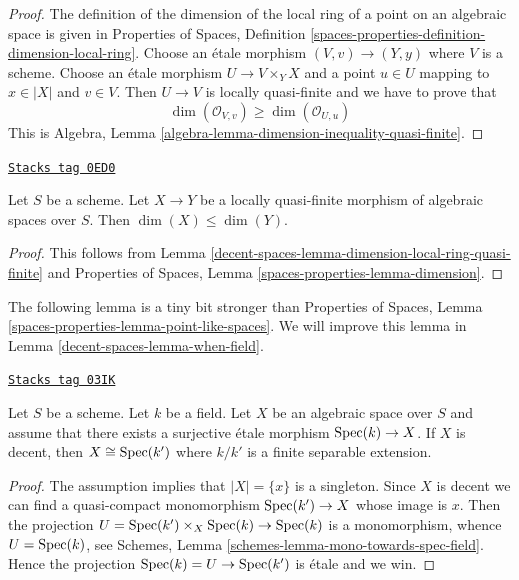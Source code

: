 \begin{proof}
The definition of the dimension of the local ring of a point on an
algebraic space is given in Properties of Spaces, Definition
\ref{spaces-properties-definition-dimension-local-ring}.
Choose an \'etale morphism $(V, v) \to (Y, y)$ where $V$ is a scheme.
Choose an \'etale morphism $U \to V \times_Y X$ and a point $u \in U$
mapping to $x \in |X|$ and $v \in V$. Then $U \to V$ is locally
quasi-finite and we have to prove that
$$
\dim(\mathcal{O}_{V, v}) \geq \dim(\mathcal{O}_{U, u})
$$
This is Algebra, Lemma \ref{algebra-lemma-dimension-inequality-quasi-finite}.
\end{proof}

\begin{lemma}
\label{decent-spaces-lemma-dimension-quasi-finite}
\href{https://stacks.math.columbia.edu/tag/0ED0}{\texttt{Stacks tag 0ED0}}

Let $S$ be a scheme. Let $X \to Y$ be a locally quasi-finite morphism
of algebraic spaces over $S$. Then $\dim(X) \leq \dim(Y)$.
\end{lemma}

\begin{proof}
This follows from Lemma \ref{decent-spaces-lemma-dimension-local-ring-quasi-finite}
and Properties of Spaces, Lemma \ref{spaces-properties-lemma-dimension}.
\end{proof}

The following lemma is a tiny bit stronger than
Properties of Spaces,
Lemma \ref{spaces-properties-lemma-point-like-spaces}.
We will improve this lemma in Lemma \ref{decent-spaces-lemma-when-field}.

\begin{lemma}
\label{decent-spaces-lemma-decent-point-like-spaces}
\href{https://stacks.math.columbia.edu/tag/03IK}{\texttt{Stacks tag 03IK}}

Let $S$ be a scheme. Let $k$ be a field. Let $X$ be an algebraic space
over $S$ and assume that there exists a surjective \'etale morphism
$\operatorname{Spec}(k) \to X$. If $X$ is decent, then $X \cong \operatorname{Spec}(k')$
where $k/k'$ is a finite separable extension.
\end{lemma}

\begin{proof}
The assumption implies that $|X| = \{x\}$ is a singleton. Since
$X$ is decent we can find a quasi-compact monomorphism $\operatorname{Spec}(k') \to X$
whose image is $x$. Then the projection
$U = \operatorname{Spec}(k') \times_X \operatorname{Spec}(k) \to \operatorname{Spec}(k)$
is a monomorphism, whence $U = \operatorname{Spec}(k)$, see
Schemes, Lemma \ref{schemes-lemma-mono-towards-spec-field}.
Hence the projection $\operatorname{Spec}(k) = U \to \operatorname{Spec}(k')$ is \'etale and
we win.
\end{proof}


